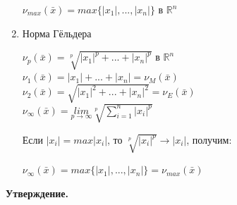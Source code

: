 \documentclass[12pt]{article}
\theoremstyle{definition}
\numberwithin{equation}{section}
\begin{document}
\begin{enumerate}
		\begin{center}
			$\nu_{max}(\bar x) = max\{|x_1|,...,|x_n|\}$ в $\mathbb{R}^n$\\\end{center}
		\item Норма Гёльдера
		\begin{center}$\nu_p(\bar x) = \sqrt[p]{|x_1|^p+...+|x_n|^p}$ в $\mathbb{R}^n$\\
			$\nu_1(\bar x) = |x_1|+...+|x_n| = \nu_M(\bar x)$\\ 
			$\nu_2(\bar x) = \sqrt{|x_1|^2+...+|x_n|^2} = \nu_E(\bar x)$\\
			$\nu_{\infty}(\bar x) = \underset{p \to \infty}{lim}\sqrt[p]{\sum\limits_{i=1}^n |x_i|^p}$\end{center}
		Если $|x_i| = max |x_i|$, то $\sqrt[p]{|x_i|^p} \to |x_i|$, получим:
		\begin{center}$\nu_{\infty}(\bar x) = max \{|x_1|,...,|x_n|\} = \nu_{max}(\bar x)$\end{center}
	\end{enumerate}
	\textbf{Утверждение.}
\end{document}
